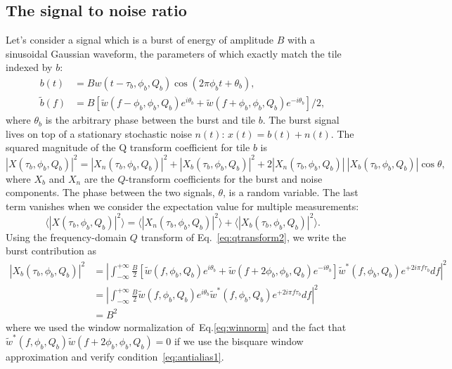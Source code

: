 \subsection{The signal to noise ratio} \label{sec:method:snr}

Let's consider a signal which is a burst of energy of amplitude $B$ with a sinusoidal Gaussian waveform, the parameters of which exactly match the tile indexed by $b$:
\begin{align}
  b(t) &= Bw(t-\tau_b, \phi_b, Q_b)\cos(2\pi\phi_b t + \theta_b),\\
  \tilde{b}(f) &= B\left[ \tilde{w}(f-\phi_b,\phi_b,Q_b)e^{i\theta_b}+\tilde{w}(f+\phi_b,\phi_b,Q_b)e^{-i\theta_b}\right]/2,
\end{align}
where $\theta_b$ is the arbitrary phase between the burst and tile $b$. The burst signal lives on top of a stationary stochastic noise $n(t)$: $x(t) = b(t) + n(t)$. The squared magnitude of the Q transform coefficient for tile $b$ is
\begin{equation}
  |X(\tau_b, \phi_b, Q_b)|^2 = |X_n(\tau_b, \phi_b, Q_b)|^2 + |X_b(\tau_b, \phi_b, Q_b)|^2 + 2|X_n(\tau_b, \phi_b, Q_b)|\ |X_b(\tau_b, \phi_b, Q_b)|\cos{\theta},
\end{equation}
where $X_b$ and $X_n$ are the $Q$-transform coefficients for the burst and noise components. The phase between the two signals, $\theta$, is a random variable. The last term vanishes when we consider the expectation value for multiple measurements:
\begin{equation}
  \langle |X(\tau_b, \phi_b, Q_b)|^2 \rangle= \langle |X_n(\tau_b, \phi_b, Q_b)|^2 \rangle + \langle |X_b(\tau_b, \phi_b, Q_b)|^2 \rangle.
\end{equation}
Using the frequency-domain $Q$ transform of Eq.~\ref{eq:qtransform2}, we write the burst contribution as
\begin{align}
  |X_b(\tau_b, \phi_b, Q_b)|^2 &= \left|\int_{-\infty}^{+\infty}{ \frac{B}{2}\left[ \tilde{w}(f,\phi_b,Q_b)e^{i\theta_b}+\tilde{w}(f+2\phi_b,\phi_b,Q_b)e^{-i\theta_b}\right] \tilde{w}^{*}(f,\phi_b,Q_b) e^{+2i\pi f \tau_b}df} \right|^2\\
  &= \left|\int_{-\infty}^{+\infty}{ \frac{B}{2} \tilde{w}(f,\phi_b,Q_b)e^{i\theta_b} \tilde{w}^{*}(f,\phi_b,Q_b) e^{+2i\pi f \tau_b}df}\right|^2 \\
  &= B^2
  \label{eq:qtransform_signal}
\end{align}
where we used the window normalization of~Eq.\ref{eq:winnorm} and the fact that $\tilde{w}^{*}(f,\phi_b,Q_b)\tilde{w}(f+2\phi_b,\phi_b,Q_b)=0$ if we use the bisquare window approximation and verify condition~\ref{eq:antialias1}.


